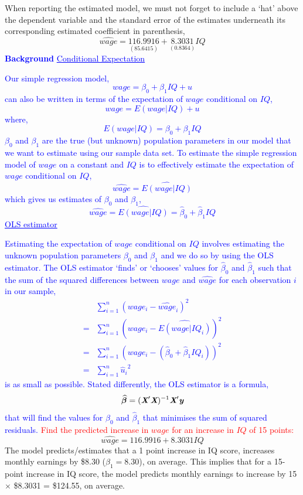 \documentclass[12pt]{report}
\newenvironment{blueframed}[1][blue]
{\def\FrameCommand{\fboxsep=\FrameSep\fcolorbox{#1}{white}}%
\MakeFramed {\advance\hsize-\width \FrameRestore}}
{\endMakeFramed}
\begin{document}
\vspace{-\baselineskip}
\noindent When reporting the estimated model, we must not forget to include a `hat' above the dependent variable and the standard error of the estimates underneath its corresponding estimated coefficient in parenthesis,
$$\widehat{wage} = \underset{(85.6415)}{116.9916} + \underset{(0.8364)}{8.3031}IQ$$
\justify
\begin{blueframed}
	\textcolor{blue}{\textbf{Background}}
	\vspace{-\baselineskip}
	\justify
	\textcolor{blue}{\underline{Conditional Expectation}}
	
	\noindent \textcolor{blue}
	{
	Our simple regression model,
	$$wage = \beta_0+\beta_1IQ+u$$
	can also be written in terms of the expectation of $wage$ conditional on $IQ$,
	$$wage = E(wage|IQ)+u$$ 
	where,
	$$E(wage|IQ) = \beta_0+\beta_1IQ$$ 	
	}
\end{blueframed}
\begin{blueframed}
	\noindent \textcolor{blue}
	{
	$\beta_0$ and $\beta_1$ are the true (but unknown) population parameters in our model that we want to estimate using our sample data set. To estimate the simple regression model of $wage$ on a constant and $IQ$ is to effectively estimate the expectation of $wage$ conditional on $IQ$,
	$$\widehat{wage} = \widehat{E(wage|IQ)}$$
	which gives us estimates of $\beta_0$ and $\beta_1$,
	$$\widehat{wage} = \widehat{E(wage|IQ)} = \hat{\beta}_0+\hat{\beta}_1IQ$$
	}
	\justify
	\textcolor{blue}{\underline{OLS estimator}}

	\noindent \textcolor{blue}
	{
	Estimating the expectation of $wage$ conditional on $IQ$ involves estimating the unknown population parameters $\beta_0$ and $\beta_1$ and we do so by using the OLS estimator. The OLS estimator ‘finds’ or ‘chooses’ values for $\hat{\beta}_0$ and $\hat{\beta}_1$ such that the sum of the squared differences between $wage$ and $\widehat{wage}$ for each observation $i$ in our sample,
	\begin{align*}
	&\sum_{i=1}^{n} (wage_i - \widehat{wage}_i)^2 \\
	=&\sum_{i=1}^{n} (wage_i - \widehat{E(wage|IQ_i)})^2 \\
	=&\sum_{i=1}^{n} (wage_i - (\hat{\beta}_0+\hat{\beta}_1IQ_i))^2 \\
	=&\sum_{i=1}^{n} {\hat{u}_i}^2
	\end{align*}
	is as small as possible.
	Stated differently, the OLS estimator is a formula,
	$$\widehat{\boldsymbol{\beta}} = (\textit{\textbf{X}}'\textit{\textbf{X}})^{-1}\textit{\textbf{X}}'\textit{\textbf{y}}$$
	that will find the values for $\hat{\beta}_0$ and $\hat{\beta}_1$ that minimises the sum of squared residuals.
	}
\end{blueframed}
\noindent \textcolor{red}{Find the predicted increase in $wage$ for an increase in $IQ$ of 15 points:}
$$\widehat{wage} = 116.9916+8.3031IQ$$
\noindent The model predicts/estimates that a 1 point increase in IQ score, increases monthly earnings by \$8.30 ($\hat{\beta}_1 = 8.30$), on average.
\noindent This implies that for a 15-point increase in IQ score, the model predicts monthly earnings to increase by 15 $\times$ \$8.3031 = \$124.55, on average.
\end{document}
